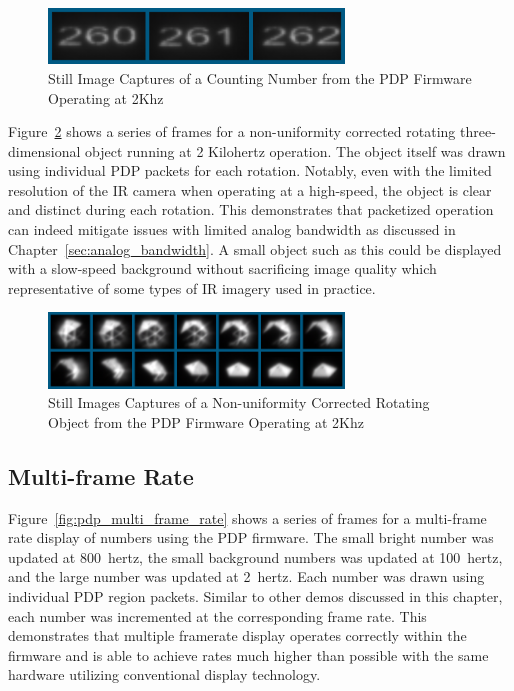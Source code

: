         \begin{figure}[t]
            \centering
            \includegraphics[width=0.7\textwidth]{fig/high_speed_numbers.png}
            \caption{Still Image Captures of a Counting Number from the PDP Firmware Operating at 2Khz}
            \label{fig:high_speed_numbers}
        \end{figure}

        Figure~\ref{fig:high_speed_rotating_object} shows a series of frames for a non-uniformity corrected rotating three-dimensional object running at {2 Kilohertz} operation. The object itself was drawn using individual PDP packets for each rotation. Notably, even with the limited resolution of the IR camera when operating at a high-speed, the object is clear and distinct during each rotation. This demonstrates that packetized operation can indeed mitigate issues with limited analog bandwidth as discussed in Chapter~\ref{sec:analog_bandwidth}. A small object such as this could be displayed with a slow-speed background without sacrificing image quality which representative of some types of IR imagery used in practice.

        \begin{figure}[t]
            \centering
            \includegraphics[width=0.7\textwidth]{fig/high_speed_rotating_object.png}
            \caption{Still Images Captures of a Non-uniformity Corrected Rotating Object from the PDP Firmware Operating at 2Khz}
            \label{fig:high_speed_rotating_object}
        \end{figure}

    \subsection{Multi-frame Rate}
        Figure~\ref{fig:pdp_multi_frame_rate} shows a series of frames for a multi-frame rate display of numbers using the PDP firmware. The small bright number was updated at \mbox{800 hertz}, the small background numbers was updated at \mbox{100 hertz}, and the large number was updated at \mbox{2 hertz}. Each number was drawn using individual PDP region packets. Similar to other demos discussed in this chapter, each number was incremented at the corresponding frame rate. This demonstrates that multiple framerate display operates correctly within the firmware and is able to achieve rates much higher than possible with the same hardware utilizing conventional display technology.

